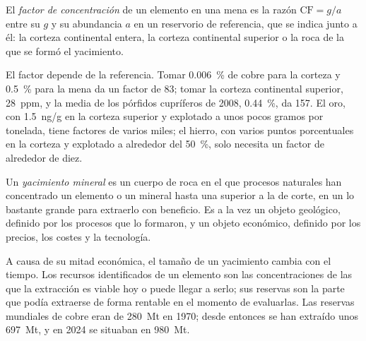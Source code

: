 \begin{definition}\label{def:b2:ore-deposits:cf}
El \emph{factor de concentración} de un elemento en una mena es la razón
$\mathrm{CF} = g/a$ entre su  $g$ y su abundancia $a$ en un reservorio de referencia, que se indica junto a él:
la corteza continental entera, la corteza continental superior o la roca de la que se formó el yacimiento.
\end{definition}

El factor depende de la referencia. Tomar \qty{0.006}{\percent} de cobre para la corteza y
\qty{0.5}{\percent} para la mena da un factor de 83; tomar la corteza continental superior,
\qty{28}{ppm}, y la  media de los pórfidos cupríferos de 2008, \qty{0.44}{\percent}, da 157. El oro,
con \qty{1.5}{ng/g} en la corteza superior y explotado a unos pocos gramos por tonelada, tiene factores de
varios miles; el hierro, con varios puntos porcentuales en la corteza y explotado a alrededor del \qty{50}{\percent}, solo necesita
un factor de alrededor de diez.

\begin{definition}\label{def:b2:ore-deposits:deposit}
Un \emph{yacimiento mineral} es un cuerpo de roca en el que procesos naturales han
concentrado un elemento o un mineral hasta una  superior a la de corte, en un  lo bastante grande
para extraerlo con beneficio. Es a la vez un objeto geológico, definido por los procesos que
lo formaron, y un objeto económico, definido por los precios, los costes y la tecnología.
\end{definition}

A causa de su mitad económica, el tamaño de un yacimiento cambia con el tiempo. Los recursos identificados
de un elemento son las concentraciones de las que la extracción es viable hoy o puede llegar a serlo; sus
reservas son la parte que podía extraerse de forma rentable en el momento de evaluarlas. Las reservas mundiales
de cobre eran de \qty{280}{Mt} en 1970; desde entonces se han extraído unos \qty{697}{Mt}, y en 2024
se situaban en \qty{980}{Mt}.

